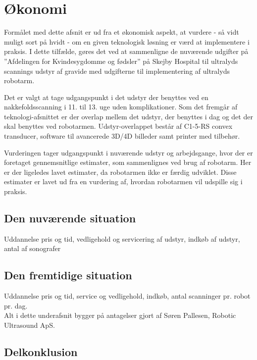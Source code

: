 \chapter{Økonomi} \label{Okonomi}

Formålet med dette afsnit er ud fra et økonomisk aspekt, at vurdere - så vidt muligt sort på hvidt - om en given teknologisk løsning er værd at implementere i praksis. I dette tilfælde, gøres det ved at sammenligne de nuværende udgifter på ”Afdelingen for Kvindesygdomme og fødsler” på Skejby Hospital til ultralyds scannings udstyr af gravide med udgifterne til implementering af ultralyds robotarm.  

Det er valgt at tage udgangspunkt i det udstyr der benyttes ved en nakkefoldsscanning i 11. til 13. uge uden komplikationer. Som det fremgår af teknologi-afsnittet er der overlap mellem det udstyr, der benyttes i dag og det der skal benyttes ved robotarmen. Udstyr-overlappet består af C1-5-RS convex transducer, software til avancerede 3D/4D billeder samt printer med tilbehør. 

Vurderingen tager udgangspunkt i nuværende udstyr og arbejdsgange, hvor der er foretaget gennemsnitlige estimater, som sammenlignes ved brug af robotarm. Her er der ligeledes lavet estimater, da robotarmen ikke er færdig udviklet. Disse estimater er lavet ud fra en vurdering af, hvordan robotarmen vil udspille sig i praksis. 

\section{Den nuværende situation}
Uddannelse pris og tid, vedligehold og servicering af udstyr, indkøb af udstyr, antal af sonografer

\section{Den fremtidige situation}
Uddannelse pris og tid, service og vedligehold, indkøb, antal scanninger pr. robot pr. dag. \\
Alt i dette underafsnit bygger på antagelser gjort af Søren Pallesen, Robotic Ultrasound ApS. 

\section{Delkonklusion}


